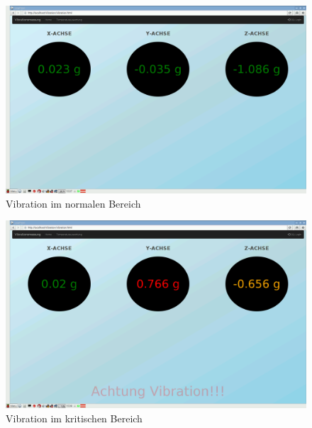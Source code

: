 \begin{figure}[!h] 
  \centering
     \includegraphics[scale=.2]{BilderAllgemein/Vib.png}
  \caption{Vibration im normalen Bereich}
\end{figure}

\begin{figure}[!h] 
  \centering
     \includegraphics[scale=.2]{BilderAllgemein/Vib1.png}
  \caption{Vibration im kritischen Bereich}
\end{figure}